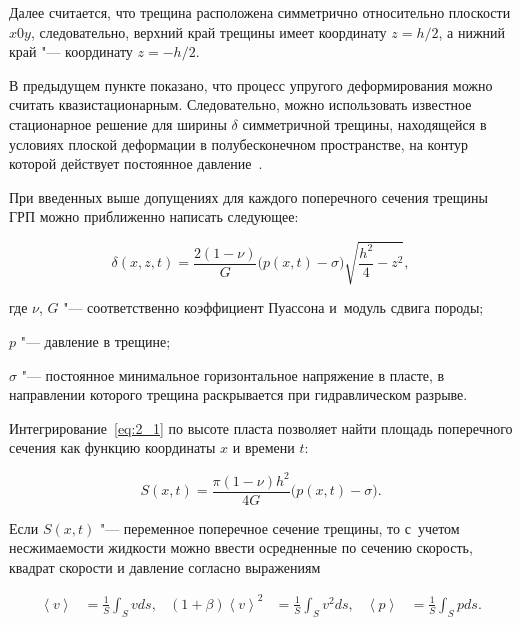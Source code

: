 Далее считается, что трещина расположена симметрично относительно плоскости $x0y$, следовательно, верхний край трещины имеет координату $z = h/2$, а нижний край "--- координату $z = -h/2$.



В предыдущем пункте показано, что процесс упругого деформирования можно считать квазистационарным. Следовательно, можно использовать известное стационарное решение для ширины $\delta$ симметричной трещины, находящейся в условиях плоской деформации в полубесконечном пространстве, на контур которой действует постоянное давление~\cite{Sneddon1}. 

При введенных выше допущениях для каждого поперечного сечения трещины ГРП можно приближенно написать следующее:

\begin{equation}

\delta  (x,z,t ) = \frac{2(1-\nu)}{G} \bigl(p (x,t )-\sigma\bigr)\sqrt{\frac{h^2}{4}-z^2},\label{eq:2_1}

\end{equation}

где $\nu$, $G$ "--- соответственно коэффициент Пуассона и~модуль сдвига породы; 

$p$ "--- давление в трещине; 

$\sigma$ "--- постоянное минимальное горизонтальное напряжение в пласте, в направлении которого трещина раскрывается при гидравлическом разрыве.



Интегрирование~\eqref{eq:2_1} по высоте пласта позволяет найти площадь поперечного сечения как функцию координаты $x$ и времени $t$:

\begin{equation}

S (x, t ) = \frac{\pi (1-\nu ) h^2}{4G}  \bigl(p (x,t)-\sigma\bigr).\label{eq:2_2}

\end{equation}

Если $S(x, t)$ "--- переменное поперечное сечение трещины, то с~учетом несжимаемости жидкости можно ввести осредненные по сечению скорость, квадрат скорости и давление согласно выражениям

\begin{align}

\left\langle v\right\rangle &= \frac{1}{S} \int_{S} vds,& \left(1+\beta\right)\left\langle v\right\rangle^2 &= \frac{1}{S} \int_{S} v^2ds, & 

\left\langle p\right\rangle &= \frac{1}{S} \int_{S} pds. \label{eq:2_3}

\end{align}

